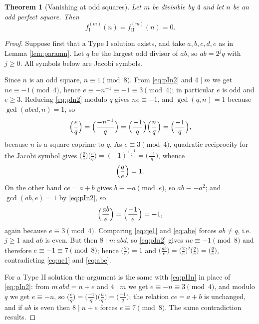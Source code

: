 \documentclass[11pt,reqno]{amsart}
\theoremstyle{plain}
\newtheorem{theorem}{Theorem}[section]
\theoremstyle{definition}
\numberwithin{equation}{section}
\newcommand{\fI}{f_{\mathrm{I}}}
\newcommand{\fII}{f_{\mathrm{II}}}
\begin{document}
\begin{theorem}[Vanishing at odd squares]\label{thm:vanish}
Let $m$ be divisible by $4$ and let $n$ be an odd perfect square. Then
\[
  \fI^{(m)}(n)=\fII^{(m)}(n)=0 .
\]
\end{theorem}

\begin{proof}
Suppose first that a Type I solution exists, and take $a,b,c,d,e$ as in Lemma
\ref{lem:paramn}. Let $q$ be the largest odd divisor of $ab$, so $ab=2^{j}q$ with
$j\ge0$. All symbols below are Jacobi symbols.

Since $n$ is an odd square, $n\equiv1\pmod 8$. From \eqref{eq:pIn2} and $4\mid m$ we get
$ne\equiv-1\pmod4$, hence $e\equiv-n^{-1}\equiv-1\equiv3\pmod4$; in particular $e$ is
odd and $e\ge3$. Reducing \eqref{eq:pIn2} modulo $q$ gives $ne\equiv-1$, and
$\gcd(q,n)=1$ because $\gcd(abcd,n)=1$, so
\[
  \Bigl(\frac eq\Bigr)=\Bigl(\frac{-n^{-1}}q\Bigr)
  =\Bigl(\frac{-1}q\Bigr)\Bigl(\frac nq\Bigr)=\Bigl(\frac{-1}q\Bigr),
\]
because $n$ is a square coprime to $q$. As $e\equiv3\pmod4$, quadratic reciprocity for
the Jacobi symbol gives
$\bigl(\tfrac qe\bigr)\bigl(\tfrac eq\bigr)=(-1)^{\frac{q-1}2}=\bigl(\tfrac{-1}q\bigr)$,
whence
\begin{equation}\label{eq:qe1}
  \Bigl(\frac qe\Bigr)=1 .
\end{equation}
On the other hand $ce=a+b$ gives $b\equiv-a\pmod e$, so $ab\equiv-a^{2}$; and
$\gcd(ab,e)=1$ by \eqref{eq:pIn2}, so
\begin{equation}\label{eq:abe}
  \Bigl(\frac{ab}e\Bigr)=\Bigl(\frac{-1}e\Bigr)=-1 ,
\end{equation}
again because $e\equiv3\pmod4$. Comparing \eqref{eq:qe1} and \eqref{eq:abe} forces
$ab\ne q$, i.e.\ $j\ge1$ and $ab$ is even. But then $8\mid m\,abd$, so \eqref{eq:pIn2}
gives $ne\equiv-1\pmod 8$ and therefore $e\equiv-1\equiv7\pmod8$; hence
$\bigl(\tfrac2e\bigr)=1$ and
$\bigl(\tfrac{ab}e\bigr)=\bigl(\tfrac2e\bigr)^{j}\bigl(\tfrac qe\bigr)=\bigl(\tfrac qe\bigr)$,
contradicting \eqref{eq:qe1} and \eqref{eq:abe}.

For a Type II solution the argument is the same with \eqref{eq:pIIn} in place of
\eqref{eq:pIn2}: from $m\,abd=n+e$ and $4\mid m$ we get $e\equiv-n\equiv3\pmod4$, and
modulo $q$ we get $e\equiv-n$, so
$\bigl(\tfrac eq\bigr)=\bigl(\tfrac{-1}q\bigr)\bigl(\tfrac nq\bigr)=\bigl(\tfrac{-1}q\bigr)$;
the relation $ce=a+b$ is unchanged, and if $ab$ is even then $8\mid n+e$ forces
$e\equiv7\pmod8$. The same contradiction results.
\end{proof}
\end{document}
